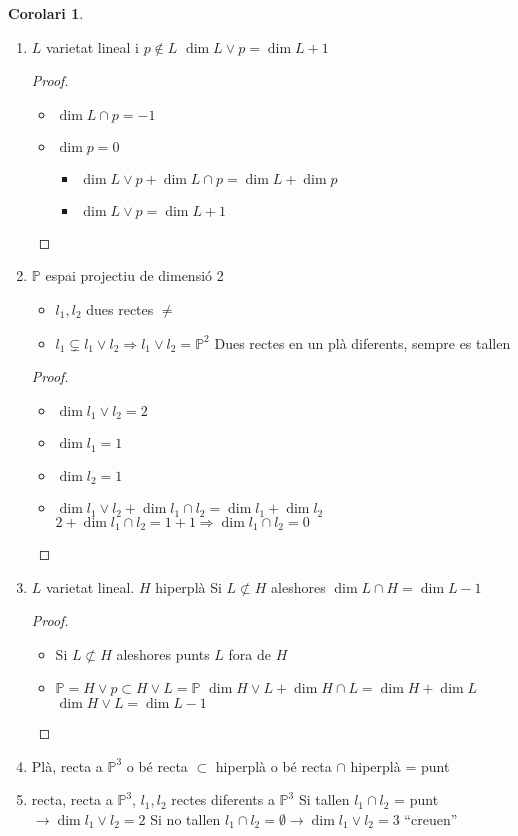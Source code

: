 \documentclass{article}
\theoremstyle{definition}
\newtheorem{coroline}[theorem]{Corolari}
\newcommand{\PP}{\mathbb{P}}
\begin{document}
\begin{coroline}
\begin{enumerate}[label=\alph*)]
\item $L$ varietat lineal i $p \notin L$
	\subitem $\dim L \vee p = \dim L + 1$
\begin{proof}
\begin{itemize}
\item $\dim L \cap p = -1$
\item $\dim p = 0$
	\begin{itemize}
	\item $\dim L \vee p + \dim L \cap p = \dim L + \dim p$
	\item $\dim L \vee p = \dim L +1$
	\end{itemize}
\end{itemize}
\end{proof}
\item $\PP$ espai projectiu de dimensió 2
\begin{itemize}
\item $l_1, l_2$ dues rectes $\neq$
\item $l_1 \varsubsetneq l_1 \vee l_2 \Rightarrow l_1 \vee l_2 = \PP^2$
\subitem Dues rectes en un plà diferents, sempre es tallen
\end{itemize}
\begin{proof}
\begin{itemize}
\item $\dim l_1 \vee l_2 = 2$
\item $\dim l_1 = 1$
\item $\dim l_2 = 1$
\item $\dim l_1 \vee l_2 + \dim l_1 \cap l_2 = \dim l_1 + \dim l_2$
	\subitem $2 + \dim l_1 \cap l_2 = 1 + 1 \Rightarrow \dim l_1 \cap l_2 = 0$
\end{itemize}
\end{proof}

\item $L$ varietat lineal. $H$ hiperplà
	\subitem Si $L \nsubset H$ aleshores $\dim L \cap H = \dim L -1$
\begin{proof}
\begin{itemize}
\item Si $L \nsubset H$ aleshores punts $L$ fora de $H$
\item $\PP = H \vee p \subset H \vee L = \PP$
	\subitem $\dim H \vee L + \dim H \cap L = \dim H + \dim L$
	\subitem $\dim H \vee L = \dim L -1$
\end{itemize}
\end{proof}

\item Plà, recta a $\PP^3$
	\subitem o bé recta $\subset$ hiperplà
	\subitem o bé recta $\cap$ hiperplà = punt

\item recta, recta a $\PP^3$, $l_1, l_2$ rectes diferents a $\PP^3$
	\subitem Si tallen $l_1 \cap l_2$ = punt $\to \dim l_1 \vee l_2 = 2$
	\subitem Si no tallen $l_1 \cap l_2 = \emptyset \to \dim l_1 \vee l_2 = 3$ ``creuen''
\end{enumerate}
\end{coroline}
\end{document}

